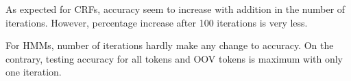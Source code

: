 As expected for CRFs, accuracy seem to increase with addition in the number of iterations. However, percentage increase after 100 iterations is very less.

For HMMs, number of iterations hardly make any change to accuracy. On the contrary, testing accuracy for all tokens and OOV tokens is maximum with only one iteration.



